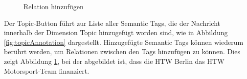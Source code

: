\begin{minipage}{0.47\linewidth}
	\begin{figure}[H]
		\centering
		\caption{Relation hinzufügen}
		\label{fig:motorsportNachricht}
	\end{figure}
\end{minipage}
\newline\newline\newline Der Topic-Button führt zur Liste aller Semantic Tags, die der Nachricht innerhalb der Dimension Topic hinzugefügt worden sind, wie in Abbildung \ref{fig:topicAnnotation} dargestellt. Hinzugefügte Semantic Tags können wiederum berührt werden, um Relationen zwischen den Tags hinzufügen zu können. Dies zeigt Abbildung \ref{fig:motorsportNachricht}, bei der abgebildet ist, dass die HTW Berlin das HTW Motorsport-Team finanziert. 
